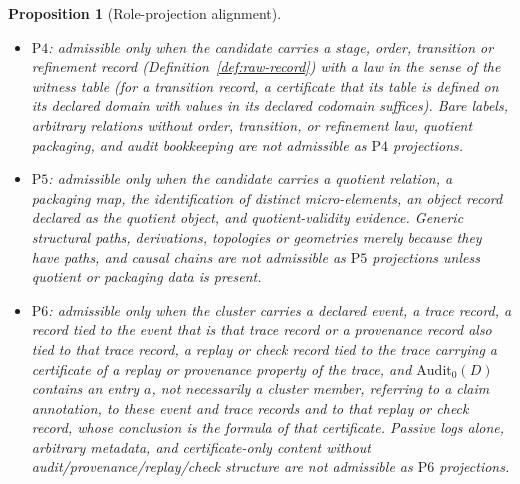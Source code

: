 \documentclass[11pt]{article}
\newtheorem{proposition}[theorem]{Proposition}
\theoremstyle{definition}
\newcommand{\Pthree}{\ensuremath{\mathrm{P3}}}
\newcommand{\Pfour}{\ensuremath{\mathrm{P4}}}
\newcommand{\Pfive}{\ensuremath{\mathrm{P5}}}
\newcommand{\Psix}{\ensuremath{\mathrm{P6}}}
\begin{document}
\begin{proposition}[Role-projection alignment]
\begin{itemize}[topsep=2pt,itemsep=1pt]
    grammar (generating moves and all rewrite rules recorded in \(D\)), generated same-source, same-target route terms, and
    route-comparison data with a non-reducibility certificate of either
alternative in the \(W_3\) row. Generic transitions, generic causal arrows, generic
    path records, and route undefinedness arising from a partial update
    map are not admissible as \Pthree{} projections unless they are
    two defined same-source, same-target route records carrying a
    non-reducibility certificate of either alternative in the \(W_3\) row.
  \item \Pfour{}: admissible only when the candidate carries a stage,
    order, transition or refinement record (Definition~\ref{def:raw-record})
    with a law in the sense of the witness table (for a transition record,
    a certificate that its table is defined on its declared domain with
    values in its declared codomain suffices). Bare labels, arbitrary
    relations without order, transition, or refinement law, quotient
    packaging, and audit bookkeeping are not admissible as \Pfour{}
    projections.
  \item \Pfive{}: admissible only when the candidate carries a quotient
    relation, a packaging map, the identification of distinct
    micro-elements, an object record declared as the quotient object, and
    quotient-validity evidence. Generic structural paths, derivations,
    topologies or geometries merely because they have paths, and causal
    chains are not admissible as \Pfive{} projections unless quotient
    or packaging data is present.
  \item \Psix{}: admissible only when the cluster carries a declared event,
    a trace record, a record tied to the event that is that trace record or a
    provenance record also tied to that trace record, a replay or check record tied to the trace carrying a certificate of a replay or provenance property of
    the trace, and \(\mathrm{Audit}_0(D)\) contains an entry \(a\), not necessarily a cluster member, referring to a claim
    annotation, to these event and trace records and to that replay or check
    record, whose conclusion is the formula of that certificate.
    Passive logs alone, arbitrary metadata, and certificate-only
    content without audit/provenance/replay/check structure are not
    admissible as \Psix{} projections.
\end{itemize}
\end{proposition}
\end{document}
